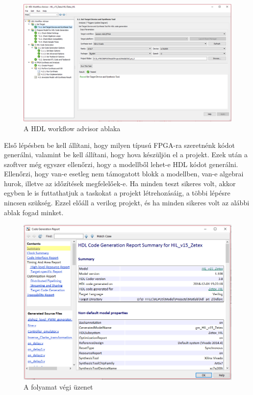 \begin{figure}[h!]
	\centering
	\includegraphics[width = \textwidth]{figures/hdl_advisor.png}
	\caption{A HDL workflow advisor ablaka} 
	\label{fig:hdl_advisor}
\end{figure}

Első lépésben be kell állítani, hogy milyen típusú FPGA-ra szeretnénk kódot generálni, valamint be kell állítani, hogy hova készüljön el a projekt. Ezek után a szoftver még egyszer ellenőrzi, hogy a modellből lehet-e HDL kódot generálni. Ellenőrzi, hogy van-e esetleg nem támogatott blokk a modellben, van-e algebrai hurok, illetve az időzítések megfelelőek-e. Ha minden teszt sikeres volt, akkor egyben le is futtathatjuk a taskokat a projekt létrehozásáig, a többi lépésre nincsen szükség. Ezzel előáll a verilog projekt, és ha minden sikeres volt az alábbi ablak fogad minket.

\begin{figure}[h!]
	\centering
	\includegraphics[width = \textwidth]{figures/hdl_report.png}
	\caption{A folyamat végi üzenet} 
	\label{fig:hdl_report}
\end{figure}

